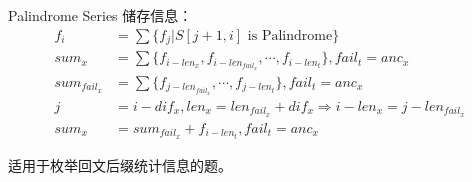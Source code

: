 Palindrome Series 储存信息：
$$
\begin{aligned}
f_i&=\sum\{f_j|S[j+1,i]\text{ is Palindrome}\}\\
sum_x&=\sum\{f_{i-len_x},f_{i-len_{fail_x}},\cdots,f_{i-len_t}\},fail_t=anc_x\\
sum_{fail_x}&=\sum\{f_{j-len_{fail_x}},\cdots,f_{j-len_t}\},fail_t=anc_x\\
j&=i-dif_x,len_x=len_{fail_x}+dif_x\Rightarrow i-len_x=j-len_{fail_x}\\
sum_x&=sum_{fail_x}+f_{i-len_t},fail_t=anc_x
\end{aligned}
$$

适用于枚举回文后缀统计信息的题。



